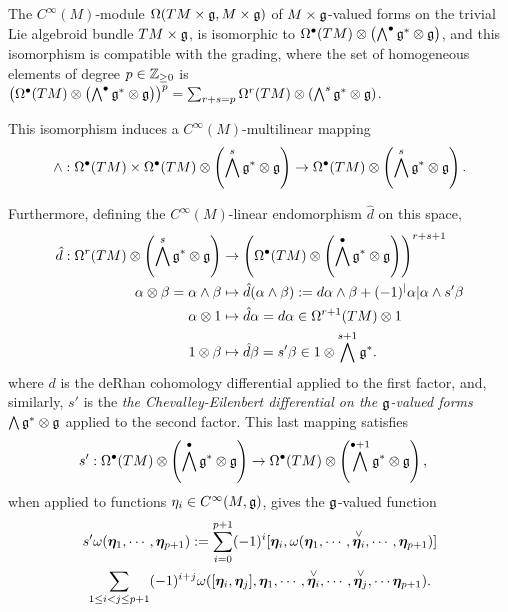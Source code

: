 \begin{theorem}
The $C^\infty(M)$-module $\Omega(TM \times \mathfrak{g}, M \times \mathfrak{g})$ of $M \times \mathfrak{g}$-valued forms on the trivial Lie algebroid bundle $TM \times \mathfrak{g}$, is isomorphic to $\Omega^\bullet(TM) \otimes \left(\bigwedge^\bullet \mathfrak{g}^* \otimes \mathfrak{g}\right)$, and this isomorphism is compatible with the grading, where the set of homogeneous elements of degree $p \in \mathbb{Z}_{\geq 0}$ is $\left( \Omega^\bullet(TM) \otimes \left(\bigwedge^\bullet \mathfrak{g}^* \otimes \mathfrak{g}\right) \right)^p = \sum_{r + s = p} \Omega^r(TM) \otimes \left(\bigwedge^s \mathfrak{g}^* \otimes \mathfrak{g}\right)$. 

This isomorphism induces a $C^\infty(M)$-multilinear mapping
\begin{equation}
    \wedge: \Omega^\bullet(TM) \times \Omega^\bullet(TM) \otimes \left(\bigwedge^s \mathfrak{g}^* \otimes \mathfrak{g}\right)
    \to 
    \Omega^\bullet(TM) \otimes \left(\bigwedge^s \mathfrak{g}^* \otimes \mathfrak{g}\right).
\end{equation}

Furthermore, defining the $C^\infty(M)$-linear endomorphism $\hat d$ on this space, 
\begin{align}
    \hat d: \Omega^r(TM) \otimes \left(\bigwedge^s \mathfrak{g}^* \otimes \mathfrak{g}\right) &\to \left( \Omega^\bullet(TM) \otimes \left(\bigwedge^\bullet \mathfrak{g}^* \otimes \mathfrak{g}\right)\right)^{r+s+1} \\
    \alpha \otimes \beta = \alpha \wedge \beta &\mapsto  \hat d (\alpha \wedge \beta) := d\alpha \wedge \beta + (-1)^|\alpha| \alpha \wedge s'\beta \\
    \alpha \otimes 1 &\mapsto \hat d\alpha = d\alpha \in \Omega^{r+1}(TM) \otimes 1 \\
    1 \otimes \beta &\mapsto \hat d\beta = s'\beta \in 1 \otimes \bigwedge^{s+1} \mathfrak{g}^*.
\end{align}
where $d$ is the deRhan cohomology differential applied to the first factor, and, similarly, $s'$ is the \emph{the Chevalley-Eilenbert differential on the $\mathfrak{g}$-valued forms $\bigwedge \mathfrak{g}^* \otimes \mathfrak{g}$} applied to the second factor. This last mapping satisfies
\begin{align*}
    s': \Omega^\bullet(TM) \otimes \left(\bigwedge^\bullet \mathfrak{g}^* \otimes \mathfrak{g}\right) &\to \Omega^\bullet(TM) \otimes \left(\bigwedge^{\bullet+1} \mathfrak{g}^* \otimes \mathfrak{g}\right),
\end{align*} when applied to functions $\eta_i \in C^\infty(M, \mathfrak{g})$, gives the $\mathfrak{g}$-valued function
\begin{multline}
    s'\omega(\bm{\eta}_1, \cdots, \bm{\eta}_{p+1}) := \sum_{i = 0}^{p+1} (-1)^i [\bm{\eta}_i, \omega(\bm{\eta}_1, \cdots, \overset{\vee}{\bm{\eta}_i}, \cdots, \bm{\eta}_{p+1})] \\
    \sum_{1 \leq i < j \leq p+1} (-1)^{i+j} \omega([\bm{\eta}_i, \bm{\eta}_j], \bm{\eta}_1, \cdots, \overset{\vee}{\bm{\eta}_i}, \cdots, \overset{\vee}{\bm{\eta}_j}, \cdots \bm{\eta}_{p+1}).
\end{multline}


\end{theorem}
